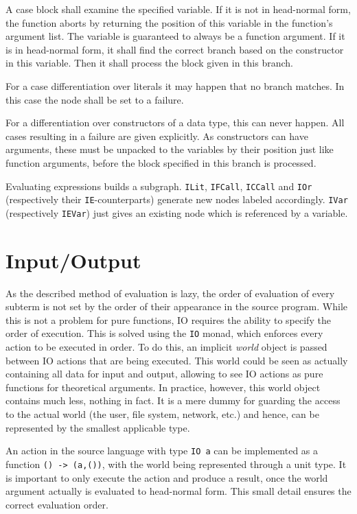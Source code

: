 A case block shall examine the specified variable.
If it is not in head-normal form, the function aborts by returning the position of this variable in the function's argument list.
The variable is guaranteed to always be a function argument.
If it is in head-normal form, it shall find the correct branch based on the constructor in this variable.
Then it shall process the block given in this branch.

For a case differentiation over literals it may happen that no branch matches.
In this case the node shall be set to a failure.

For a differentiation over constructors of a data type, this can never happen.
All cases resulting in a failure are given explicitly.
As constructors can have arguments, these must be unpacked to the variables by their position just like function arguments, before the block specified in this branch is processed.

Evaluating expressions builds a subgraph.
\texttt{ILit}, \texttt{IFCall}, \texttt{ICCall} and \texttt{IOr} (respectively their \texttt{IE}-counterparts) generate new nodes labeled accordingly.
\texttt{IVar} (respectively \texttt{IEVar}) just gives an existing node which is referenced by a variable.


\section{Input/Output}

As the described method of evaluation is lazy, the order of evaluation of every subterm is not set by the order of their appearance in the source program.
While this is not a problem for pure functions, IO requires the ability to specify the order of execution.
This is solved using the \texttt{IO} monad, which enforces every action to be executed in order.
To do this, an implicit \emph{world} object is passed between IO actions that are being executed.
This world could be seen as actually containing all data for input and output, allowing to see IO actions as pure functions for theoretical arguments.
In practice, however, this world object contains much less, nothing in fact.
It is a mere dummy for guarding the access to the actual world (the user, file system, network, etc.) and hence, can be represented by the smallest applicable type.

An action in the source language with type \texttt{IO a} can be implemented as a function \texttt{() -> (a,())}, with the world being represented through a unit type.
It is important to only execute the action and produce a result, once the world argument actually is evaluated to head-normal form.
This small detail ensures the correct evaluation order.

